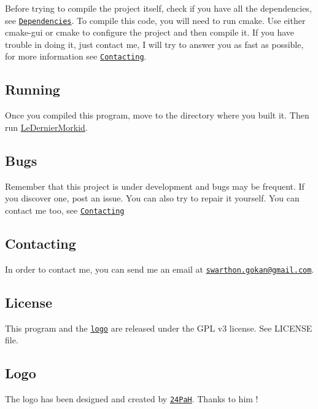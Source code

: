 Before trying to compile the project itself, check if you have all the dependencies, see \href{#dependencies}{\tt Dependencies}. To compile this code, you will need to run cmake. Use either {\ttfamily cmake-\/gui} or {\ttfamily cmake} to configure the project and then compile it. If you have trouble in doing it, just contact me, I will try to answer you as fast as possible, for more information see \href{#contacting}{\tt Contacting}.

\subsection*{Running}

Once you compiled this program, move to the directory where you built it. Then run {\ttfamily \hyperlink{class_le_dernier_morkid}{Le\+Dernier\+Morkid}}.

\subsection*{Bugs}

Remember that this project is under development and bugs may be frequent. If you discover one, post an issue. You can also try to repair it yourself. You can contact me too, see \href{#contacting}{\tt Contacting}

\subsection*{Contacting}

In order to contact me, you can send me an email at \href{mailto:swarthon.gokan@gmail.com}{\tt swarthon.\+gokan@gmail.\+com}.

\subsection*{License}

This program and the \href{#logo}{\tt logo} are released under the G\+PL v3 license. See L\+I\+C\+E\+N\+SE file.

\subsection*{Logo}

The logo has been designed and created by \href{http://github.com/24PaH}{\tt 24\+PaH}. Thanks to him ! 